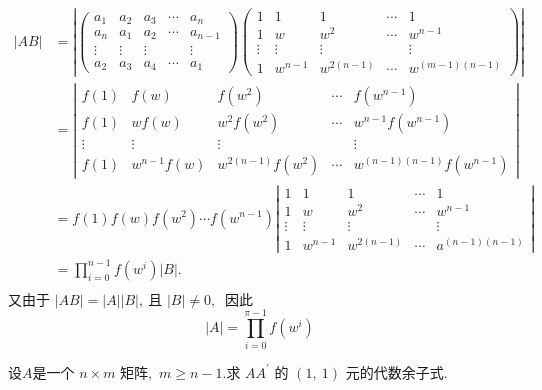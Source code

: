 \begin{solution}
$$\begin{aligned}
		|A B| & =\left|\left(\begin{array}{ccccc}
			a_{1} & a_{2} & a_{3} & \cdots & a_{n} \\
			a_{n} & a_{1} & a_{2} & \cdots & a_{n-1} \\
			\vdots & \vdots & \vdots & & \vdots \\
			a_{2} & a_{3} & a_{4} & \cdots & a_{1}
		\end{array}\right)\left(\begin{array}{ccccc}
			1 & 1 & 1 & \cdots & 1 \\
			1 & w & w^{2} & \cdots & w^{n-1} \\
			\vdots & \vdots & \vdots & & \vdots \\
			1 & w^{n-1} & w^{2(n-1)} & \cdots & w^{(m-1)(n-1)}
		\end{array}\right)\right|\\
		& =\left|\begin{array}{ccccc}
			f(1) & f(w) & f\left(w^{2}\right) & \cdots & f\left(w^{n-1}\right) \\
			f(1) & w f(w) & w^{2} f\left(w^{2}\right) & \cdots & w^{n-1} f\left(w^{n-1}\right) \\
			\vdots & \vdots & \vdots & & \vdots \\
			f(1) & w^{n-1} f(w) & w^{2(n-1)} f\left(w^{2}\right) & \cdots & w^{(n-1)(n-1)} f\left(w^{n-1}\right)
		\end{array}\right|\\
		& =f(1) f(w) f\left(w^{2}\right) \cdots f\left(w^{n-1}\right)\left|\begin{array}{ccccc}
			1 & 1 & 1 & \cdots & 1 \\
			1 & w & w^{2} & \cdots & w^{n-1} \\
			\vdots & \vdots & \vdots & & \vdots \\
			1 & w^{n-1} & w^{2(n-1)} & \cdots & a^{(n-1)(n-1)}
		\end{array}\right| \\
		& =\prod\limits_{i=0}^{n-1} f\left(w^{i}\right)|B| . \\
	\end{aligned}
	$$
	又由于  $|A B|=|A||B| ,\  $且  $|B| \neq 0 ,\ $ 因此
	$$|A|=\prod_{i=0}^{\pi-1} f\left(w^{i}\right)$$
\end{solution}
\newpage
\begin{problem}
	设$  A  $是一个  $n \times m $ 矩阵,\  $ m \geqslant n-1 .$求 $ A A^{\prime} $ 的 $ (1,\ 1) $ 元的代数余子式.
\end{problem}
